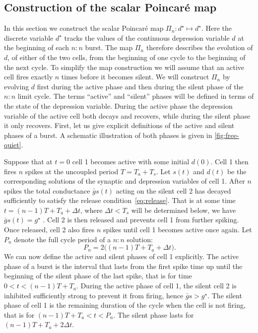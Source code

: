 \subsection{Construction of the scalar Poincaré map}
In this section we construct the scalar Poincaré map $\Pi_n:d^{\star}\mapsto d^{\star}$.
Here the discrete variable $d^{\star}$ tracks the values of the continuous depression variable $d$ at the beginning of each $n:n$ burst.
The map $\Pi_{n}$ therefore describes the evolution of $d$, of either of the two cells, from the beginning of one cycle to the beginning of the next cycle.
To simplify the map construction we will assume that an active cell fires exactly $n$ times before it becomes silent.
We will construct $\Pi_n$ by evolving $d$ first during the active phase and then during the silent phase of the $n:n$ limit cycle.
The terms ``active'' and ``silent'' phases will be defined in terms of the state of the depression variable.
During the active phase the depression variable of the active cell both decays and recovers, while during the silent phase it only recovers.
First, let us give explicit definitions of the active and silent phases of a burst.
A schematic illustration of both phases is given in \cref{fig:free-quiet}.

Suppose that at $t=0$ cell 1 becomes active with some initial $d(0)$. Cell 1 then fires $n$ spikes at the uncoupled period $T=T_{a}+T_{s}$.
Let $s(t)$ and $d(t)$ be the corresponding solutions of the synaptic and depression variables of cell 1.
After $n$ spikes the total conductance $\bar g s(t)$ acting on the silent cell 2 has decayed sufficiently to satisfy the release condition~\eqref{eq:release}.
That is at some time $t=(n-1)T + T_{a} + \Delta t$, where $\Delta t < T_{s}$ will be determined below, we have $\bar g s(t)=g^{\star}$ \citep{bose2011}.
Cell 2 is then released and prevents cell 1 from further spiking.
Once released, cell 2 also fires $n$ spikes until cell 1 becomes active once again.
Let $P_n$ denote the full cycle period of a $n:n$ solution:
\begin{equation}
	~\label{eq:P}
	P_n = 2\Big( (n-1)T + T_{a} + \Delta t \Big).
\end{equation}
We can now define the active and silent phases of cell 1 explicitly.
The active phase of a burst is the interval that lasts from the first spike time up until the beginning of the silent phase of the last spike, that is for time $0<t<(n-1)T + T_{a}$.
During the active phase of cell 1, the silent cell 2 is inhibited sufficiently strong to prevent it from firing, hence $\bar g s > g^{\star}$.
The silent phase of cell 1 is the remaining duration of the cycle when the cell is not firing, that is for $(n-1)T + T_{a} < t < P_n$.
The silent phase lasts for $(n-1)T + T_{a} + 2\Delta t$.

